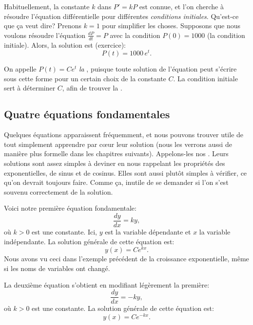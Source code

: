Habituellement, la constante $k$ dans $P' = kP$ est connue, et l'on cherche à résoudre
l'équation différentielle pour différentes \emph{conditions initiales}.
Qu'est-ce que ça veut dire?
Prenons $k=1$ pour simplifier les choses.
Supposons que nous voulons résoudre l'équation $\frac{dP}{dt} = P$
avec la condition $P(0) = 1000$ (la condition initiale).
Alors, la solution est (exercice):
\begin{equation*}
	P(t) = 1000 \, e^t .
\end{equation*}

On appelle $P(t) = C e^t$ \emph{la },
puisque toute solution de l'équation peut s'écrire sous cette forme pour un certain choix de la constante $C$.
La condition initiale sert à déterminer $C$, afin de trouver la
\emph{}.

\subsection{Quatre équations fondamentales} \label{subsection:fourfundamental}

Quelques équations apparaissent fréquemment, et nous pouvons trouver utile de tout simplement apprendre par c{\oe}ur leur solution
(nous les verrons aussi de manière plus formelle dans les chapitres suivants).
Appelons-les nos .
Leurs solutions sont assez simples à deviner
en nous rappelant les propriétés des exponentielles, de sinus et de cosinus.
Elles sont aussi plutôt simples à vérifier, ce qu'on devrait toujours faire.
Comme ça, inutile de se demander si l'on s'est souvenu correctement de la solution.

\medskip

Voici notre première équation fondamentale:
\begin{equation*}
	\frac{dy}{dx} = k y,
\end{equation*}
où $k > 0$ est une constante.
Ici, $y$ est la variable dépendante et $x$ la variable indépendante.
La solution générale de cette équation est:
\begin{equation*}
	y(x) = C e^{kx} .
\end{equation*}
Nous avons vu ceci dans l'exemple précédent de la croissance exponentielle, même si les noms de variables ont changé.

\medskip

La deuxième équation s'obtient en modifiant légèrement la première:
\begin{equation*}
	\frac{dy}{dx} = -k y,
\end{equation*}
où $k > 0$ est une constante. La solution générale de cette équation est:
\begin{equation*}
	y(x) = C e^{-kx}.
\end{equation*}

